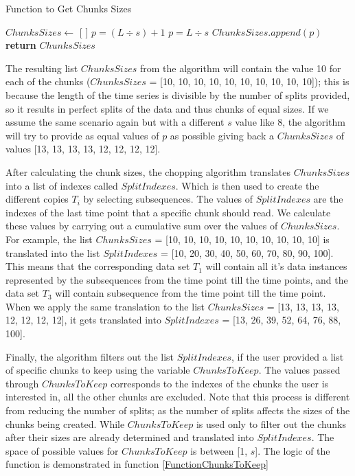 \begin{algorithm}
    \caption{Function to Get Chunks Sizes}\label{FunctionChunkSizes}
    \begin{algorithmic}[1]
      \State $ChunksSizes \gets$ [ ]
                \State $p = (L \div{s}) + 1$
            \Else
                \State $p = L \div{s}$
            \EndIf
            \State $ChunksSizes.append(p)$
        \EndFor
        \State \textbf{return} $ChunksSizes$
      \EndFunction
    \end{algorithmic}
\end{algorithm}

The resulting list $ChunksSizes$ from the algorithm will contain the value 10 for each of the chunks ($ChunksSizes$ = [10, 10, 10, 10, 10, 10, 10, 10, 10, 10]);
this is because the length of the time series is divisible by the number of splits provided, so it results in perfect splits of the data and thus chunks of equal sizes.
If we assume the same scenario again but with a different $s$ value like 8, the algorithm will try to provide as equal values of $p$ as possible
giving back a $ChunksSizes$ of values [13, 13, 13, 13, 12, 12, 12, 12].

After calculating the chunk sizes, the chopping algorithm translates $ChunksSizes$ into a list of indexes called $SplitIndexes$.
Which is then used to create the different copies $T_{i}$ by selecting subsequences.
The values of $SplitIndexes$ are the indexes of the last time point that a specific chunk should read.
We calculate these values by carrying out a cumulative sum over the values of $ChunksSizes$.
For example, the list $ChunksSizes$ = [10, 10, 10, 10, 10, 10, 10, 10, 10, 10] is translated into the list $SplitIndexes$ = [10, 20, 30, 40, 50, 60, 70, 80, 90, 100].
This means that the corresponding data set $T_{1}$ will contain all it's data instances represented by the subsequences from the  time point till the  time points,
and the data set $T_{3}$ will contain subsequence from the  time point till the  time point.
When we apply the same translation to the list $ChunksSizes$ = [13, 13, 13, 13, 12, 12, 12, 12], it gets translated into $SplitIndexes$ = [13, 26, 39, 52, 64, 76, 88, 100].

Finally, the algorithm filters out the list $SplitIndexes$, if the user provided a list of specific chunks to keep using the variable $ChunksToKeep$.
The values passed through $ChunksToKeep$ corresponds to the indexes of the chunks the user is interested in, all the other chunks are excluded.
Note that this process is different from reducing the number of splits; as the number of splits affects the sizes of the chunks being created.
While $ChunksToKeep$ is used only to filter out the chunks after their sizes are already determined and translated into $SplitIndexes$.
The space of possible values for $ChunksToKeep$ is between [1, $s$]. The logic of the function is demonstrated in function \ref{FunctionChunksToKeep}

